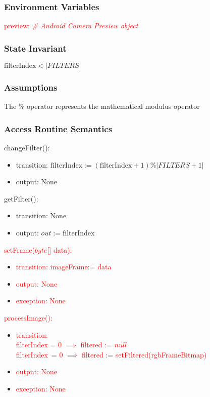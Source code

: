 \documentclass[12pt, titlepage]{article}
\begin{document}
\subsubsection* {Environment Variables}

\textcolor{red}{preview: \textit{\# Android Camera Preview object}}

\subsubsection* {State Invariant}

$\text{filterIndex} < |FILTERS|$

\subsubsection* {Assumptions}

The $\%$ operator represents the mathematical modulus operator

\subsubsection* {Access Routine Semantics}

changeFilter():
\begin{itemize}
\item transition: $\text{filterIndex} := (\text{filterIndex} + 1) \% |FILTERS + 1|$
\item output: None

\end{itemize}

\noindent getFilter():
\begin{itemize}
\item transition: None
\item output: $out := \text{filterIndex}$
\end{itemize}

\noindent \textcolor{red}{setFrame($byte$[] data):}
\begin{itemize}
\item \textcolor{red}{transition: imageFrame:= data}
\item \textcolor{red}{output: None}
\item \textcolor{red}{exception: None}
\end{itemize}

\noindent \textcolor{red}{processImage():}
\begin{itemize}
\item \textcolor{red}{transition: \\filterIndex = 0 $\implies$ filtered := $null$ \\
filterIndex\ \!= 0 $\implies$ filtered := setFiltered(rgbFrameBitmap)
}

\item \textcolor{red}{output: None}
\item \textcolor{red}{exception: None}
\end{itemize}
\end{document}
